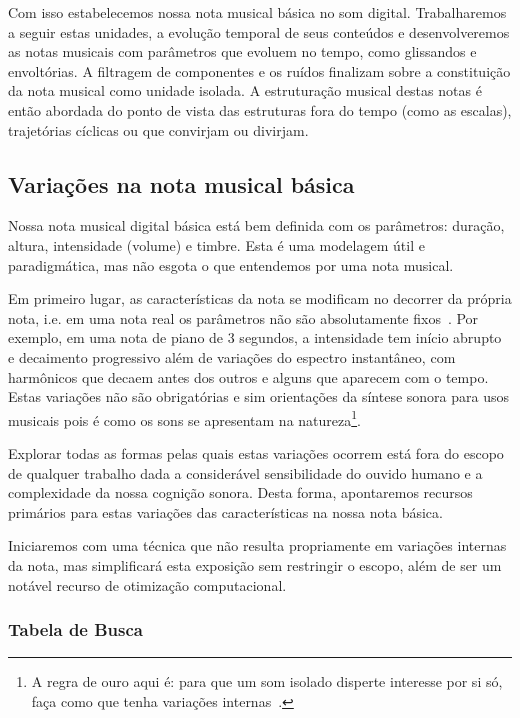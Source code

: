 Com isso estabelecemos nossa nota musical básica no som digital. Trabalharemos a seguir estas unidades, a evolução temporal de seus conteúdos e desenvolveremos as notas musicais com parâmetros que evoluem no tempo, como glissandos e envoltórias. 
A filtragem de componentes e os ruídos finalizam sobre a constituição da nota musical como unidade isolada. A estruturação musical destas notas é então abordada do ponto de vista das estruturas fora do tempo (como as escalas), trajetórias cíclicas ou que convirjam ou divirjam.

\clearpage

\subsection{Variações na nota musical básica}

Nossa nota musical digital básica está bem definida com os parâmetros:
duração, altura, intensidade (volume) e timbre. Esta é uma modelagem
útil e paradigmática, mas não esgota o que entendemos por
uma nota musical.

Em primeiro lugar, as características da nota se modificam no decorrer
da própria nota, i.e. em uma nota real os parâmetros
não são absolutamente fixos~\cite{Chowning}. Por exemplo, em uma nota de piano
de 3 segundos, a intensidade tem início abrupto e decaimento progressivo
além de variações do espectro instantâneo, com harmônicos que
decaem antes dos outros e alguns que aparecem com o tempo.
Estas variações não são obrigatórias e sim orientações da
síntese sonora para usos musicais pois é como os sons
se apresentam na natureza\footnote{A regra de ouro
aqui é: para que um som isolado disperte interesse
por si só, faça como que tenha variações internas~\cite{Roederer}.}. 

Explorar todas as formas pelas quais estas variações ocorrem está fora
do escopo de qualquer trabalho dada a considerável sensibilidade do ouvido humano
e a complexidade da nossa cognição sonora. Desta forma, apontaremos
recursos primários para estas variações das características na nossa nota
básica.

Iniciaremos com uma técnica que não resulta propriamente
em variações internas da nota, mas simplificará esta exposição
sem restringir o escopo, além de ser um notável recurso de otimização
computacional.



\subsubsection{Tabela de Busca}

